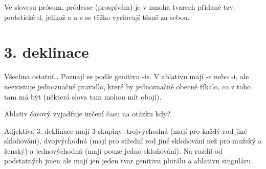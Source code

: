 \documentclass[12pt]{article}					%
\begin{document}
    Ve slovesu prósum, pródesse (prospívám) je v mnoha tvarech přidané tzv. protetické d, jelikož o a e se těžko vyslovují těsně za sebou.

\section{3. deklinace}
    Všechna ostatní… Poznají se podle genitivu -is. V ablativu mají -e nebo -í, ale neexistuje jednoznačné pravidlo, které by jednoznačně obecně říkalo, co z toho tam má být (některá slova tam mohou mít obojí).


    Ablativ časový vyjadřuje určení času na otázku kdy?

    Adjektiva 3. deklinace mají 3 skupiny: trojvýchodná (mají pro každý rod jiné skloňování), dvojvýchodná (mají pro střední rod jiné skloňování než pro mužský a ženský) a jednovýchodná (mají pouze jedno skloňování). Na rozdíl od podstatných jmen ale mají jen jeden tvar genitivu plurálu a ablativu singuláru.




\newpage
\end{document}
